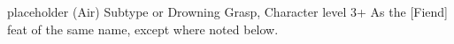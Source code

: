 \shortdescfeat
{placeholder}
{(Air) Subtype or Drowning Grasp, Character level 3+}
{As the [Fiend] feat of the same name, except where noted below.}

